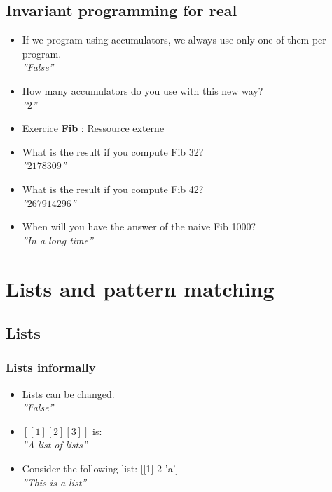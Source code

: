 \documentclass[fr,license=none]{../../../eplsummary}
\begin{document}
		\subsection{Invariant programming for real}
			\begin{itemize}
				\item If we program using accumulators, we always use only one of them per program.\\
					\textit{''False''}
				\item How many accumulators do you use with this new way?\\
					\textit{''$2$''}
				\item Exercice \textbf{Fib} : Ressource externe\\
					
				\item What is the result if you compute {Fib 32}?\\
					\textit{''$2178309$''}
				\item What is the result if you compute {Fib 42}?\\
					\textit{''$267914296$''}
				\item When will you have the answer of the naive {Fib 1000}?\\
					\textit{''In a long time''}
			\end{itemize}
	
	\section{Lists and pattern matching}
		\subsection{Lists}
			\subsubsection*{Lists informally}
				\begin{itemize}
					\item Lists can be changed.\\
						\textit{''False''}
					\item $[[1][2][3]]$ is:\\
						\textit{''A list of lists''}
					\item Consider the following list: [[1] 2 'a']\\
						\textit{''This is a list''}
				\end{itemize}
\end{document}
